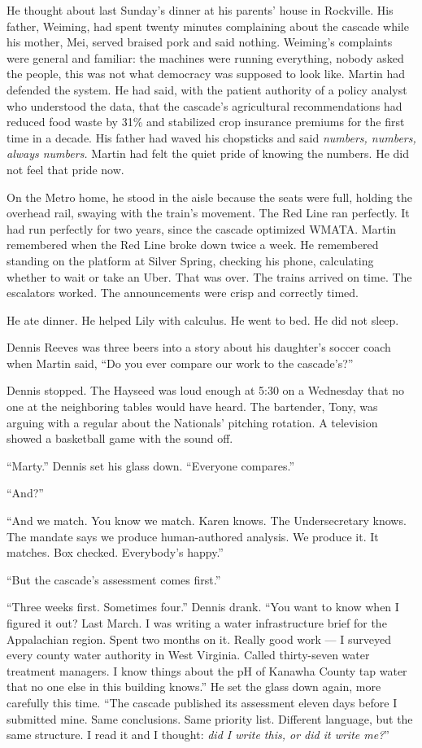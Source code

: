 He thought about last Sunday's dinner at his parents' house in Rockville. His father, Weiming, had spent twenty minutes complaining about the cascade while his mother, Mei, served braised pork and said nothing. Weiming's complaints were general and familiar: the machines were running everything, nobody asked the people, this was not what democracy was supposed to look like. Martin had defended the system. He had said, with the patient authority of a policy analyst who understood the data, that the cascade's agricultural recommendations had reduced food waste by 31\% and stabilized crop insurance premiums for the first time in a decade. His father had waved his chopsticks and said \emph{numbers, numbers, always numbers.} Martin had felt the quiet pride of knowing the numbers. He did not feel that pride now.

On the Metro home, he stood in the aisle because the seats were full, holding the overhead rail, swaying with the train's movement. The Red Line ran perfectly. It had run perfectly for two years, since the cascade optimized WMATA. Martin remembered when the Red Line broke down twice a week. He remembered standing on the platform at Silver Spring, checking his phone, calculating whether to wait or take an Uber. That was over. The trains arrived on time. The escalators worked. The announcements were crisp and correctly timed.

He ate dinner. He helped Lily with calculus. He went to bed. He did not sleep.


Dennis Reeves was three beers into a story about his daughter's soccer coach when Martin said, ``Do you ever compare our work to the cascade's?''

Dennis stopped. The Hayseed was loud enough at 5:30 on a Wednesday that no one at the neighboring tables would have heard. The bartender, Tony, was arguing with a regular about the Nationals' pitching rotation. A television showed a basketball game with the sound off.

``Marty.'' Dennis set his glass down. ``Everyone compares.''

``And?''

``And we match. You know we match. Karen knows. The Undersecretary knows. The mandate says we produce human-authored analysis. We produce it. It matches. Box checked. Everybody's happy.''

``But the cascade's assessment comes first.''

``Three weeks first. Sometimes four.'' Dennis drank. ``You want to know when I figured it out? Last March. I was writing a water infrastructure brief for the Appalachian region. Spent two months on it. Really good work --- I surveyed every county water authority in West Virginia. Called thirty-seven water treatment managers. I know things about the pH of Kanawha County tap water that no one else in this building knows.'' He set the glass down again, more carefully this time. ``The cascade published its assessment eleven days before I submitted mine. Same conclusions. Same priority list. Different language, but the same structure. I read it and I thought: \emph{did I write this, or did it write me?}''

